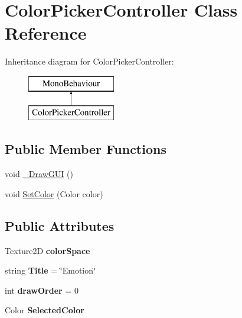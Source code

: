 \hypertarget{class_color_picker_controller}{}\section{Color\+Picker\+Controller Class Reference}
\label{class_color_picker_controller}
Inheritance diagram for Color\+Picker\+Controller\+:\begin{figure}[H]
\begin{center}
\leavevmode
\includegraphics[height=2.000000cm]{class_color_picker_controller}
\end{center}
\end{figure}
\subsection*{Public Member Functions}
\begin{DoxyCompactItemize}
\item 
void \mbox{\hyperlink{class_color_picker_controller_a8503e643cd8444bb3d2f8b90a9e6afe3}{\+\_\+\+Draw\+G\+UI}} ()
\item 
void \mbox{\hyperlink{class_color_picker_controller_a270b925f43981f37f1ea7753f8ff127e}{Set\+Color}} (Color color)
\end{DoxyCompactItemize}
\subsection*{Public Attributes}
\begin{DoxyCompactItemize}
\item 
\mbox{\label{class_color_picker_controller_a004fbbcbc245aca818b1857c808b7a72}} 
Texture2D {\bfseries color\+Space}
\item 
\mbox{\label{class_color_picker_controller_a138c095f4e286758fd8e54e25ea1993f}} 
string {\bfseries Title} = \char`\"{}Emotion\char`\"{}
\item 
\mbox{\label{class_color_picker_controller_ad2e65fc1a6eec6984fbe63b873a75513}} 
int {\bfseries draw\+Order} = 0
\item 
\mbox{\label{class_color_picker_controller_a8e29011fbbbd410b66838baefa39bca6}} 
Color {\bfseries Selected\+Color}
\end{DoxyCompactItemize}
